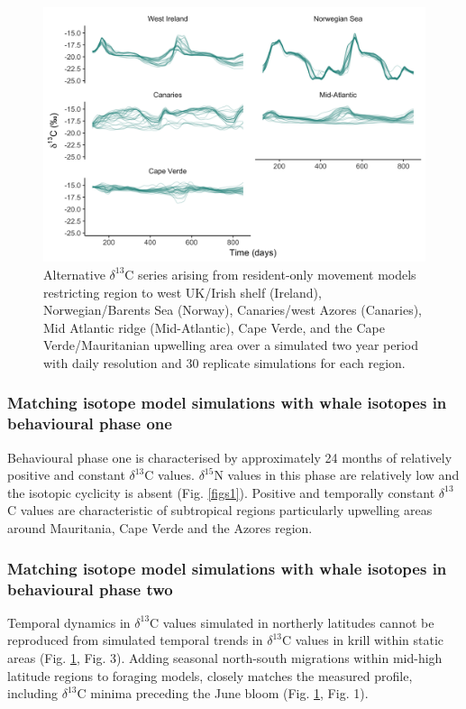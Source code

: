 \documentclass[a4paper,12pt]{article}
\begin{document}
  \begin{figure}[!htbp]
    \centering
      \includegraphics[width=\linewidth]{figures/Figure-S4-regions-d13C.png}
      \caption{Alternative $\delta^{13}$C series arising from resident-only movement models restricting region to west UK/Irish shelf (Ireland), Norwegian/Barents Sea (Norway), Canaries/west Azores (Canaries), Mid Atlantic ridge (Mid-Atlantic), Cape Verde, and the Cape Verde/Mauritanian upwelling area over a simulated two year period with daily resolution and 30 replicate simulations for each region.} %
      \label{figs4}
  \end{figure}
 
\subsubsection*{Matching isotope model simulations with whale isotopes in behavioural phase one}
Behavioural phase one is characterised by approximately 24 months of relatively positive and constant $\delta^{13}$C values. 
$\delta^{15}$N values in this phase are relatively low and the isotopic cyclicity is absent (Fig. \ref{figs1}). 
Positive and temporally constant $\delta^{13}$C values are characteristic of subtropical regions particularly upwelling areas around Mauritania, Cape Verde and the Azores region.
 
\subsubsection*{Matching isotope model simulations with whale isotopes in behavioural phase two}
Temporal dynamics in $\delta^{13}$C values simulated in northerly latitudes cannot be reproduced from simulated temporal trends in $\delta^{13}$C values in krill within static areas (Fig. \ref{figs4}, Fig. 3). 
Adding seasonal north-south migrations within mid-high latitude regions to foraging models, closely matches the measured profile, including $\delta^{13}$C minima preceding the June bloom (Fig. \ref{figs4}, Fig. 1).
\end{document}
